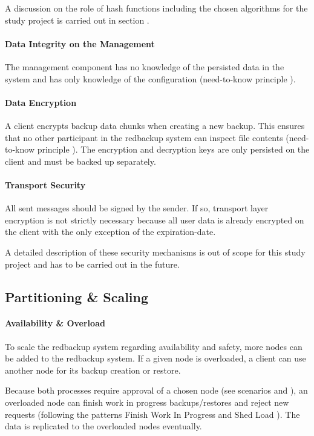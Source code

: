 A discussion on the role of hash functions including the chosen algorithms for the study project is carried out in section .

\paragraph{Data Integrity on the Management} The \gls{management} component has no knowledge of the persisted data in the system and has only knowledge of the configuration (need-to-know principle \cite{security-patterns}).

\paragraph{Data Encryption} A \gls{client} encrypts backup data \glspl{chunk} when creating a new backup. This ensures that no other participant in the redbackup system can inspect file contents (need-to-know principle \cite{security-patterns}). The encryption and decryption keys are only persisted on the \gls{client} and must be backed up separately.

\paragraph{Transport Security} All sent \glspl{message} should be signed by the sender. If so, transport layer encryption is not strictly necessary because all user data is already encrypted on the \gls{client} with the only exception of the \gls{expiration-date}.

A detailed description of these security mechanisms is out of scope for this study project and has to be carried out in the future.

\subsection{Partitioning \& Scaling}

\paragraph{Availability \& Overload} To scale the redbackup system regarding availability and safety, more \glspl{node} can be added to the redbackup system. If a given \gls{node} is overloaded, a \gls{client} can use another \gls{node} for its backup creation or restore.

Because both processes require approval of a chosen \gls{node} (see scenarios  and ), an overloaded \gls{node} can finish work in progress backups/restores and reject new requests (following the patterns Finish Work In Progress and Shed Load \cite{fault-tolerance}). The data is replicated to the overloaded \glspl{node} eventually.

